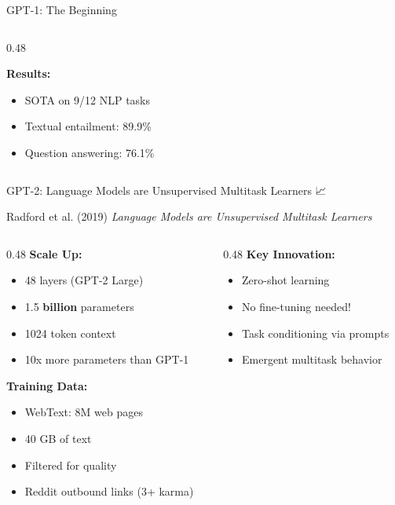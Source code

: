 \documentclass[aspectratio=169]{beamer}
\begin{document}
\begin{frame}{GPT-1: The Beginning 🌱}
\begin{columns}[T]
\begin{column}{0.48\textwidth}
\vspace{0.5em}

\textbf{Results:}
\begin{itemize}
    \item SOTA on 9/12 NLP tasks
    \item Textual entailment: 89.9\%
    \item Question answering: 76.1\%
\end{itemize}
\end{column}
\end{columns}
\end{frame}

\begin{frame}{GPT-2: Language Models are Unsupervised Multitask Learners 📈}
\begin{block}{Radford et al. (2019)}
\textit{Language Models are Unsupervised Multitask Learners}
\end{block}

\vspace{0.5em}

\begin{columns}[T]
\begin{column}{0.48\textwidth}
\textbf{Scale Up:}
\begin{itemize}
    \item 48 layers (GPT-2 Large)
    \item 1.5 \textbf{billion} parameters
    \item 1024 token context
    \item 10x more parameters than GPT-1
\end{itemize}

\vspace{0.5em}

\textbf{Training Data:}
\begin{itemize}
    \item WebText: 8M web pages
    \item 40 GB of text
    \item Filtered for quality
    \item Reddit outbound links (3+ karma)
\end{itemize}
\end{column}

\begin{column}{0.48\textwidth}
\textbf{Key Innovation:}
\begin{itemize}
    \item \alert{Zero-shot learning}
    \item No fine-tuning needed!
    \item Task conditioning via prompts
    \item Emergent multitask behavior
\end{itemize}


\end{column}
\end{columns}
\end{frame}
\end{document}
